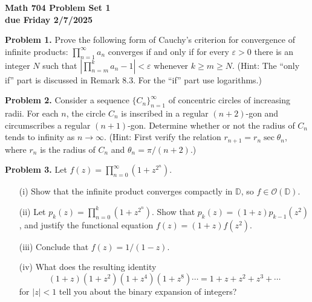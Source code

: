 \documentclass[12pt]{amsart}
\newcommand{\ve}{\varepsilon}
\newcommand{\OO}{{\mathcal O}}
\newcommand{\DD}{{\mathbb D}}
\newcommand{\vs}{\vspace{2mm}}
\begin{document}
\begin{center}
{\bf \large Math 704 Problem Set 1} \vs \\
{\bf due Friday 2/7/2025} \vs \vs
\end{center}

\noindent
{\bf Problem 1.} Prove the following form of Cauchy's criterion for convergence of infinite products: $\prod_{n=1}^{\infty} a_n$ converges if and only if for every $\ve>0$ there is an integer $N$ such that $|\prod_{n=m}^k a_n -1|<\ve$ whenever $k \geq m \geq N$. (Hint: The ``only if'' part is discussed in Remark 8.3. For the ``if'' part use logarithms.) \vs 

\noindent
{\bf Problem 2.} Consider a sequence $\{ C_n \}_{n=1}^{\infty}$ of concentric circles of increasing radii. For each $n$, the circle $C_n$ is inscribed in a regular $(n+2)$-gon and circumscribes a regular $(n+1)$-gon. Determine whether or not the radius of $C_n$ tends to infinity as $n \to \infty$. (Hint: First verify the relation $r_{n+1}=r_n \sec \theta_n$, where $r_n$ is the radius of $C_n$ and $\theta_n = \pi/(n+2)$.) \vs

\begin{figure}[h]
\end{figure} 

\noindent
{\bf Problem 3.} Let $f(z)=\prod_{n=0}^{\infty} (1+z^{2^n})$. \vs
\begin{enumerate}
\item[(i)]
Show that the infinite product converges compactly in $\DD$, so $f \in \OO(\DD)$. \vs
\item[(ii)]
Let $p_k(z)=\prod_{n=0}^k (1+z^{2^n})$. Show that $p_k(z)=(1+z)p_{k-1}(z^2)$, and justify the functional equation $f(z)=(1+z)f(z^2)$. \vs
\item[(iii)]
Conclude that $f(z)=1/(1-z)$. \vs
\item[(iv)]
What does the resulting identity
$$
(1+z)(1+z^2)(1+z^4)(1+z^8) \cdots = 1+z+z^2+z^3+\cdots 
$$
for $|z|<1$ tell you about the binary expansion of integers? \vs
\end{enumerate}
\end{document}
